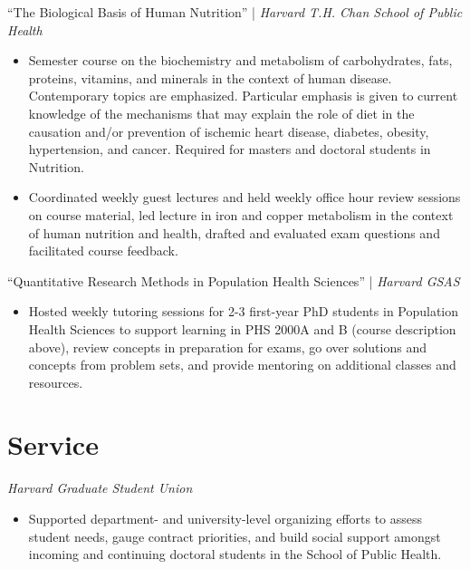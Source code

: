 \documentclass{cv_style}
\begin{document}
``The Biological Basis of Human Nutrition'' | \textit{Harvard T.H. Chan School of Public Health}
\begin{itemize}
  \vspace{0em} \item Semester course on the biochemistry and metabolism of carbohydrates, fats, proteins, vitamins, and minerals in the context of human disease. Contemporary topics are emphasized. Particular emphasis is given to current knowledge of the mechanisms that may explain the role of diet in the causation and/or prevention of ischemic heart disease, diabetes, obesity, hypertension, and cancer. Required for masters and doctoral students in Nutrition.
  \item \parskip 1pt Coordinated weekly guest lectures and held weekly office hour review sessions on course material, led lecture in iron and copper metabolism in the context of human nutrition and health, drafted and evaluated exam questions and facilitated course feedback.
\end{itemize}

``Quantitative Research Methods in Population Health Sciences'' | \textit{Harvard GSAS}
\begin{itemize}
  \vspace{0em} \item Hosted weekly tutoring sessions for 2-3 first-year PhD students in Population Health Sciences to support learning in PHS 2000A and B (course description above), review concepts in preparation for exams, go over solutions and concepts from problem sets, and provide mentoring on additional classes and resources.
\end{itemize}


\section{Service}

\textit{Harvard Graduate Student Union}
\begin{itemize}
    \item Supported department- and university-level organizing efforts to assess student needs, gauge contract priorities, and build social support amongst incoming and continuing doctoral students in the School of Public Health. 
\end{itemize}
\end{document}
